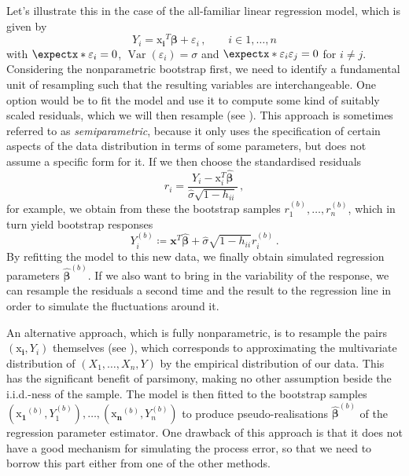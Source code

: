 \documentclass[a4paper]{book}
\begin{document}
Let's illustrate this in the case of the all-familiar linear regression model, which is given by
\begin{equation} \label{eq:linear-model}
    Y_i = \bm{\mathrm{x}_i}^T \bm{\beta} + \varepsilon_i \,, \qquad i \in {1, \dots, n}
\end{equation}
with $\expect{\varepsilon_i} = 0$, $\operatorname{Var}(\varepsilon_i) = \sigma$ and $\expect{\varepsilon_i \varepsilon_j} = 0$ for $i \neq j$. Considering the nonparametric bootstrap first, we need to identify a fundamental unit of resampling such that the resulting variables are interchangeable. One option would be to fit the model and use it to compute some kind of suitably scaled residuals, which we will then resample (see \cite[Algorithm 6.1]{davison}). This approach is sometimes referred to as \emph{semiparametric}, because it only uses the specification of certain aspects of the data distribution in terms of some parameters, but does not assume a specific form for it. If we then choose the standardised residuals
\begin{equation}
    r_i = \frac{Y_i - \bm{\mathrm{x}}^T_i \widehat{\bm{\beta}}}{\widehat{\sigma} \sqrt{1 - h_{ii}}} \,,
\end{equation}
for example, we obtain from these the bootstrap samples $r^{(b)}_1, \dots, r^{(b)}_n$, which in turn yield bootstrap responses
\begin{equation}
    Y_i^{(b)} \coloneqq \mathbf{x}^T \widehat{\bm{\beta}} + \widehat{\sigma} \sqrt{1 - h_{ii}} r^{(b)}_i \,.
\end{equation}
By refitting the model to this new data, we finally obtain simulated regression parameters $\widehat{\bm{\beta}}^{(b)}$. If we also want to bring in the variability of the response, we can resample the residuals a second time and the result to the regression line in order to simulate the fluctuations around it.


An alternative approach, which is fully nonparametric, is to resample the pairs $(\bm{\mathrm{x}_i}, Y_i)$ themselves (see \cites[Section 9.5]{efron:intro}[Algorithm 6.2]{davison}), which corresponds to approximating the multivariate distribution of $(X_1, \dots, X_n, Y)$ by the empirical distribution of our data. This has the significant benefit of parsimony, making no other assumption beside the i.i.d.-ness of the sample. The model is then fitted to the bootstrap samples $(\bm{\mathrm{x}_1}^{(b)}, Y^{(b)}_1), \dots, (\bm{\mathrm{x}_n}^{(b)}, Y^{(b)}_n)$ to produce pseudo-realisations $\widehat{\bm{\beta}}^{(b)}$ of the regression parameter estimator. One drawback of this approach is that it does not have a good mechanism for simulating the process error, so that we need to borrow this part either from one of the other methods.
\end{document}
